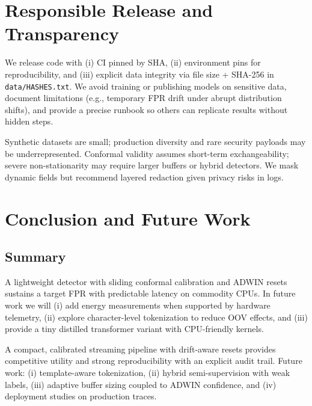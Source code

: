 \documentclass[10pt,twocolumn]{article}
\begin{document}
\section{Responsible Release and Transparency}
We release code with (i) CI pinned by SHA, (ii) environment pins for reproducibility, and (iii) explicit data integrity via file size + SHA-256 in \texttt{data/HASHES.txt}. We avoid training or publishing models on sensitive data, document limitations (e.g., temporary FPR drift under abrupt distribution shifts), and provide a precise runbook so others can replicate results without hidden steps.


Synthetic datasets are small; production diversity and rare security payloads may be underrepresented. Conformal validity assumes short-term exchangeability; severe non-stationarity may require larger buffers or hybrid detectors. We mask dynamic fields but recommend layered redaction given privacy risks in logs.

\section{Conclusion and Future Work}
\balance


\subsection*{Summary}
A lightweight detector with sliding conformal calibration and ADWIN resets sustains a target FPR with predictable latency on commodity CPUs. In future work we will (i) add energy measurements when supported by hardware telemetry, (ii) explore character-level tokenization to reduce OOV effects, and (iii) provide a tiny distilled transformer variant with CPU-friendly kernels.


A compact, calibrated streaming pipeline with drift-aware resets provides competitive utility and strong reproducibility with an explicit audit trail. Future work: (i) template-aware tokenization, (ii) hybrid semi-supervision with weak labels, (iii) adaptive buffer sizing coupled to ADWIN confidence, and (iv) deployment studies on production traces.



\end{document}
